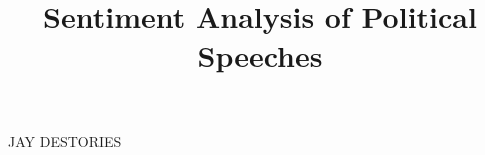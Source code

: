 \documentclass{amsart}
\theoremstyle{definition}
\theoremstyle{remark}
\numberwithin{equation}{section}
\begin{document}

\title{Sentiment Analysis of Political Speeches}









\maketitle

\begin{center}
\small{JAY DESTORIES}\\
\end{center}







\end{document}

